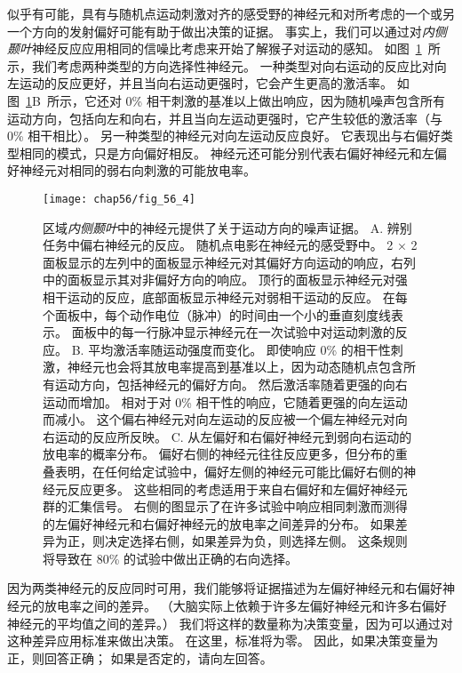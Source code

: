 似乎有可能，具有与随机点运动刺激对齐的感受野的神经元和对所考虑的一个或另一个方向的发射偏好可能有助于做出决策的证据。
事实上，我们可以通过对\textit{内侧颞叶}神经反应应用相同的信噪比考虑来开始了解猴子对运动的感知。
如图~\ref{fig:56_4}~所示，我们考虑两种类型的方向选择性神经元。
一种类型对向右运动的反应比对向左运动的反应更好，并且当向右运动更强时，它会产生更高的激活率。
如图~\ref{fig:56_4}B~所示，它还对 0\% 相干刺激的基准以上做出响应，因为随机噪声包含所有运动方向，包括向左和向右，并且当向左运动更强时，它产生较低的激活率（与 0\% 相干相比）。
另一种类型的神经元对向左运动反应良好。
它表现出与右偏好类型相同的模式，只是方向偏好相反。
神经元还可能分别代表右偏好神经元和左偏好神经元对相同的弱右向刺激的可能放电率。


\begin{figure}[htbp]
	\centering
	\texttt{[image: chap56/fig\_56\_4]}
	\caption{区域\textit{内侧颞叶}中的神经元提供了关于运动方向的噪声证据。
		A. 辨别任务中偏右神经元的反应。
		随机点电影在神经元的感受野中。
		2 × 2 面板显示的左列中的面板显示神经元对其偏好方向运动的响应，右列中的面板显示其对非偏好方向的响应。
		顶行的面板显示神经元对强相干运动的反应，底部面板显示神经元对弱相干运动的反应。
		在每个面板中，每个动作电位（脉冲）的时间由一个小的垂直刻度线表示。
		面板中的每一行脉冲显示神经元在一次试验中对运动刺激的反应\cite{mazurek2003role}。
		B. 平均激活率随运动强度而变化。
		即使响应 0\% 的相干性刺激，神经元也会将其放电率提高到基准以上，因为动态随机点包含所有运动方向，包括神经元的偏好方向。
		然后激活率随着更强的向右运动而增加。
		相对于对 0\% 相干性的响应，它随着更强的向左运动而减小。
		这个偏右神经元对向左运动的反应被一个偏左神经元对向右运动的反应所反映。
		C. 从左偏好和右偏好神经元到弱向右运动的放电率的概率分布。
		偏好右侧的神经元往往反应更多，但分布的重叠表明，在任何给定试验中，偏好左侧的神经元可能比偏好右侧的神经元反应更多。
		这些相同的考虑适用于来自右偏好和左偏好神经元群的汇集信号。
		右侧的图显示了在许多试验中响应相同刺激而测得的左偏好神经元和右偏好神经元的放电率之间差异的分布。
		如果差异为正，则决定选择右侧，如果差异为负，则选择左侧。
		这条规则将导致在 80\% 的试验中做出正确的右向选择。}
	\label{fig:56_4}
\end{figure}


因为两类神经元的反应同时可用，我们能够将证据描述为左偏好神经元和右偏好神经元的放电率之间的差异。
（大脑实际上依赖于许多左偏好神经元和许多右偏好神经元的平均值之间的差异。）
我们将这样的数量称为决策变量，因为可以通过对这种差异应用标准来做出决策。
在这里，标准将为零。
因此，如果决策变量为正，则回答正确；
如果是否定的，请向左回答。


